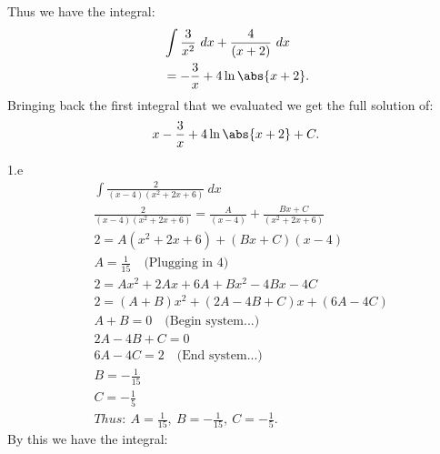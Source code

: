 \documentclass{report}
\begin{document}
    \pagebreak \bigbreak \noindent 
    Thus we have the integral:
    \begin{align*}
        &\int \frac{3}{x^{2}}\ dx + \frac{4}{(x+2)}\ dx \\
        &=-\frac{3}{x} +4\ln{\abs{x+2}}
    .\end{align*}
    \bigbreak \noindent 
    Bringing back the first integral that we evaluated we get the full solution of:
    \begin{align*}
       x-\frac{3}{x}+4\ln{\abs{x+2}}  + C
    .\end{align*}
    
    \bigbreak \noindent 
    1.e
    \bigbreak \noindent 
    \begin{align*}
        &\int \frac{2}{(x-4)(x^{2}+2x+6)}\ dx \\
        &\frac{2}{(x-4)(x^{2}+2x+6)} = \frac{A}{(x-4)} + \frac{Bx+C}{(x^{2}+2x+6)} \\
        &2 = A(x^{2}+2x+6) + (Bx+C)(x-4) \\
        &A=\frac{1}{15}\quad \text{(Plugging in 4)} \\
        &2= Ax^{2}+2Ax+6A +Bx^{2}-4Bx-4C  \\
        &2 =(A+B)x^{2}+(2A-4B+C)x+(6A-4C)  \\
        &A+B = 0 \quad \text{(Begin system...)} \\
        &2A -4B + C = 0 \\
        & 6A-4C = 2 \quad \text{(End system...)} \\
        &B = -\frac{1}{15} \\
        &C = -\frac{1}{5} \\
        &Thus:\ A = \frac{1}{15},\ B=-\frac{1}{15},\ C=-\frac{1}{5}
    .\end{align*}
    \bigbreak \noindent 
    By this  we have the integral:
\end{document}
